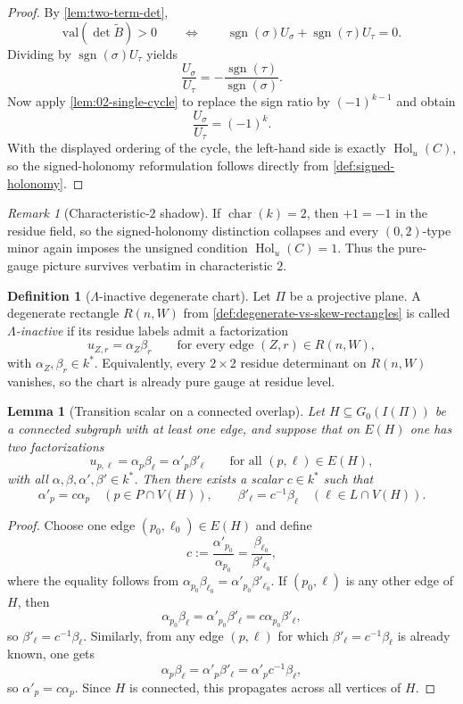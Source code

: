 \documentclass[11pt]{amsart}
\numberwithin{equation}{section}
\theoremstyle{plain}
\newtheorem{lemma}[theorem]{Lemma}
\theoremstyle{definition}
\newtheorem{definition}[theorem]{Definition}
\theoremstyle{remark}
\newtheorem{remark}[theorem]{Remark}
\newcommand{\val}{\mathrm{val}}
\newcommand{\Lam}{\Lambda}
\begin{document}
\begin{proof}
By \cref{lem:two-term-det},
\[
\val(\det \widetilde B)>0
\qquad\Longleftrightarrow\qquad
\operatorname{sgn}(\sigma)U_{\sigma}+\operatorname{sgn}(\tau)U_{\tau}=0.
\]
Dividing by $\operatorname{sgn}(\sigma)U_{\tau}$ yields
\[
\frac{U_{\sigma}}{U_{\tau}}=-\frac{\operatorname{sgn}(\tau)}{\operatorname{sgn}(\sigma)}.
\]
Now apply \cref{lem:02-single-cycle} to replace the sign ratio by $(-1)^{k-1}$ and obtain
\[
\frac{U_{\sigma}}{U_{\tau}}=(-1)^k.
\]
With the displayed ordering of the cycle, the left-hand side is exactly $\operatorname{Hol}_{u}(C)$, so the signed-holonomy reformulation
follows directly from \cref{def:signed-holonomy}.
\end{proof}

\begin{remark}[Characteristic-$2$ shadow]
If $\operatorname{char}(k)=2$, then $+1=-1$ in the residue field, so the signed-holonomy distinction collapses and every $(0,2)$-type
minor again imposes the unsigned condition $\operatorname{Hol}_{u}(C)=1$. Thus the pure-gauge picture survives verbatim in
characteristic $2$.
\end{remark}

\begin{definition}[$\Lam$-inactive degenerate chart]
\label{def:lam-inactive-chart}
Let $\Pi$ be a projective plane. A degenerate rectangle $R(n,W)$ from \cref{def:degenerate-vs-skew-rectangles} is called \emph{$\Lam$-inactive} if its residue labels admit a factorization
\[
u_{Z,r}=\alpha_Z\beta_r
\qquad\text{for every edge }(Z,r)\in R(n,W),\]
with $\alpha_Z,\beta_r\in k^*$. Equivalently, every $2\times2$ residue determinant on $R(n,W)$ vanishes, so the chart is already pure gauge at residue level.
\end{definition}

\begin{lemma}[Transition scalar on a connected overlap]
\label{lem:atlas-transition-scalar}
Let $H\subseteq G_0(I(\Pi))$ be a connected subgraph with at least one edge, and suppose that on $E(H)$ one has two factorizations
\[u_{p,\ell}=\alpha_p\beta_\ell=\alpha'_p\beta'_\ell
\qquad\text{for all }(p,\ell)\in E(H),\]
with all $\alpha,\beta,\alpha',\beta'\in k^*$. Then there exists a scalar $c\in k^*$ such that
\[
\alpha'_p=c\alpha_p \quad (p\in P\cap V(H)),
\qquad
\beta'_\ell=c^{-1}\beta_\ell \quad (\ell\in L\cap V(H)).
\]
\end{lemma}

\begin{proof}
Choose one edge $(p_0,\ell_0)\in E(H)$ and define
\[
c:=\frac{\alpha'_{p_0}}{\alpha_{p_0}}=\frac{\beta_{\ell_0}}{\beta'_{\ell_0}},
\]
where the equality follows from $\alpha_{p_0}\beta_{\ell_0}=\alpha'_{p_0}\beta'_{\ell_0}$. If $(p_0,\ell)$ is any other edge of $H$, then
\[
\alpha_{p_0}\beta_{\ell}=\alpha'_{p_0}\beta'_{\ell}=c\alpha_{p_0}\beta'_{\ell},
\]
so $\beta'_{\ell}=c^{-1}\beta_{\ell}$. Similarly, from any edge $(p,\ell)$ for which $\beta'_{\ell}=c^{-1}\beta_{\ell}$ is already known, one gets
\[
\alpha_p\beta_{\ell}=\alpha'_p\beta'_{\ell}=\alpha'_p c^{-1}\beta_{\ell},
\]
so $\alpha'_p=c\alpha_p$. Since $H$ is connected, this propagates across all vertices of $H$.
\end{proof}
\end{document}
